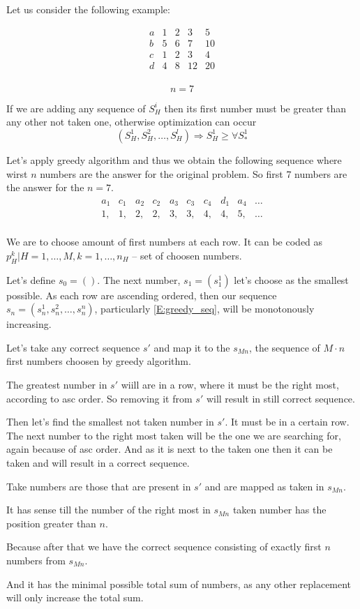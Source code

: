 \documentclass{amsart}
\begin{document}
Let us consider the following example:
\begin{multicols}{2}
\[
  \begin{matrix}
    a & 1 & 2 & 3 & 5 \\
    b & 5 & 6 & 7 & 10 \\
    c & 1 & 2 & 3 & 4 \\
    d & 4 & 8 & 12 & 20 \\
  \end{matrix}
\]

\hfill

\[
  n = 7
\]

If we are adding any sequence of $S_H^i$ then its first number
must be greater than any other not taken one, otherwise
optimization can occur
\[
  (S_H^1, S_H^2,\dots, S_H^l) \Rightarrow S_H^1 \geqslant \forall S_*^1
\]
\end{multicols}

Let's apply greedy algorithm and thus we obtain the following sequence
where wirst $n$ numbers are the answer for the original problem.
So first 7 numbers are the answer for the $n=7$.
\begin{equation}\label{E:greedy_seq}
  \begin{matrix}
    a_1 & c_1 & a_2 & c_2 & a_3 & c_3 & c_4 & d_1 & a_4 & \dots \\
    1,  & 1,  & 2,  & 2,  & 3,  & 3,  &4,  & 4,   & 5,  & \dots \\
  \end{matrix}
\end{equation}

We are to choose amount of first numbers at each row.
It can be coded as ${p_H^k | H = 1,\dots,M, k=1,\dots,n_H}$ -- set
of choosen numbers.

Let's define $s_0=()$. The next number, $s_1=(s_1^1)$
let's choose as the smallest possible.
As each row are ascending ordered, then our sequence
$s_n=(s_n^1, s_n^2, \dots, s_n^n)$, particularly \eqref{E:greedy_seq},
will be monotonously increasing.

Let's take any correct sequence $s'$ and map it to the $s_{Mn}$,
the sequence of $M \cdot n$ first numbers choosen by greedy algorithm.

The greatest number in $s'$ wiill are in a row, where it must be
the right most, according to asc order. So removing it from $s'$
will result in still correct sequence.

Then let's find the smallest not taken number in $s'$. It must be in
a certain row. The next number to the right most taken will be the
one we are searching for, again because of asc order. And as it is
next to the taken one then it can be taken and will result
in a correct sequence.

Take numbers are those that are present in $s'$ and are mapped as taken
in $s_{Mn}$.

It has sense till the number of the right most in $s_{Mn}$ taken number
has the position greater than $n$.

Because after that we have the correct sequence consisting of exactly
first $n$ numbers from $s_{Mn}$.

And it has the minimal possible total sum of numbers, as any other
replacement will only increase the total sum.
\end{document}
